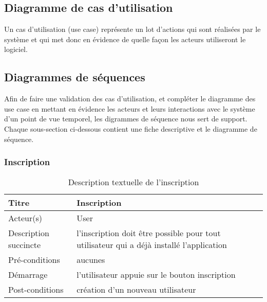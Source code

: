 \subsection{Diagramme de cas d'utilisation} %
\label{sub:diagrammes_de_cas_d_utilisation}
Un cas d’utilisation (use case) représente un lot d’actions qui sont réalisées par le système et qui met donc en évidence de quelle façon les acteurs utiliseront le logiciel.


\subsection{Diagrammes de séquences} %
\label{sub:diagrammes_de_séquence}
Afin de faire une validation des cas d'utilisation, et compléter le diagramme des use case en mettant en
évidence les acteurs et leurs interactions avec le système d’un point de vue temporel, les digrammes de séquence nous sert de support.\newline
Chaque sous-section ci-dessous contient une fiche descriptive et le diagramme de séquence.
\subsubsection{Inscription} %
\begin{table}[H]
\begin{center}
    \begin{tabular}{ | l | p{10cm} |}
    \hline
    Titre & Inscription \\ \hline
    Acteur(s) & User \\ \hline
    Description succincte & l'inscription doit être possible pour tout utilisateur qui a déjà installé l'application \\ \hline
    Pré-conditions & aucunes \\ \hline
    Démarrage & l'utilisateur appuie sur le bouton inscription \\ \hline
    Post-conditions & création d'un nouveau utilisateur \\ \hline
    \end{tabular}
    \caption{Description textuelle de l'inscription}
\end{center}
\end{table}

